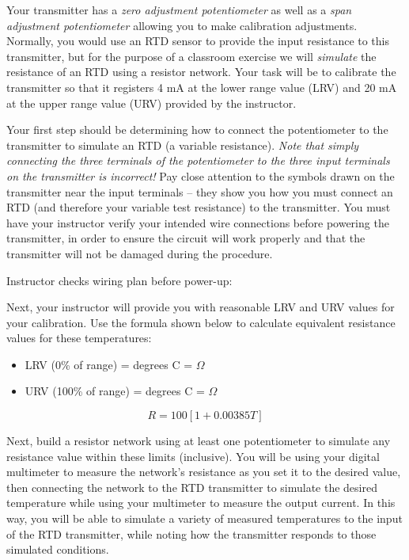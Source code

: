 \documentclass[12pt,a4paper]{article}
\begin{document}
Your transmitter has a {\it zero adjustment potentiometer} as well as a {\it span adjustment potentiometer} allowing you to make calibration adjustments.  Normally, you would use an RTD sensor to provide the input resistance to this transmitter, but for the purpose of a classroom exercise we will {\it simulate} the resistance of an RTD using a resistor network.  Your task will be to calibrate the transmitter so that it registers 4 mA at the lower range value (LRV) and 20 mA at the upper range value (URV) provided by the instructor.

\vskip 10pt

Your first step should be determining how to connect the potentiometer to the transmitter to simulate an RTD (a variable resistance).  {\it Note that simply connecting the three terminals of the potentiometer to the three input terminals on the transmitter is incorrect!}  Pay close attention to the symbols drawn on the transmitter near the input terminals -- they show you how you must connect an RTD (and therefore your variable test resistance) to the transmitter.  You must have your instructor verify your intended wire connections before powering the transmitter, in order to ensure the circuit will work properly and that the transmitter will not be damaged during the procedure.

\vskip 10pt

Instructor checks wiring plan before power-up: \underbar{\hskip 20pt}

\vskip 20pt

Next, your instructor will provide you with reasonable LRV and URV values for your calibration.  Use the formula shown below to calculate equivalent resistance values for these temperatures:

\begin{itemize}
\item{} LRV (0\% of range) = \underbar{\hskip 50pt} degrees C = \underbar{\hskip 50pt} $\Omega$
\vskip 10pt
\item{} URV (100\% of range) = \underbar{\hskip 50pt} degrees C = \underbar{\hskip 50pt} $\Omega$
\end{itemize}

$$R = 100 [ 1 + 0.00385 T ]$$

\vfil \eject

Next, build a resistor network using at least one potentiometer to simulate any resistance value within these limits (inclusive).  You will be using your digital multimeter to measure the network's resistance as you set it to the desired value, then connecting the network to the RTD transmitter to simulate the desired temperature while using your multimeter to measure the output current.  In this way, you will be able to simulate a variety of measured temperatures to the input of the RTD transmitter, while noting how the transmitter responds to those simulated conditions.
\end{document}

